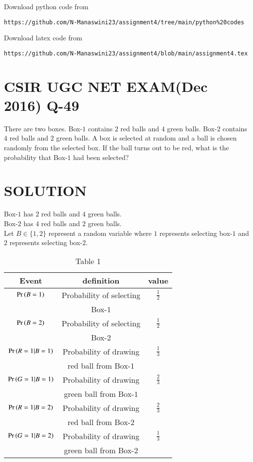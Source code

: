 \documentclass[journal,12pt,twocolumn]{IEEEtran}
\begin{document}
\renewcommand{\thefigure}{\theenumi}
\renewcommand{\thetable}{\theenumi}
Download python code from 
\begin{lstlisting}
https://github.com/N-Manaswini23/assignment4/tree/main/python%20codes
\end{lstlisting}
%
Download latex code from 
\begin{lstlisting}
https://github.com/N-Manaswini23/assignment4/blob/main/assignment4.tex
\end{lstlisting}
%

\section*{CSIR UGC NET EXAM(Dec 2016) Q-49}
There are two boxes. Box-$1$ contains $2$ red balls and $4$ green balls. Box-$2$ contains $4$ red balls and $2$ green balls. A box is selected at random and a ball is chosen randomly from the selected box. If the ball turns out to be red, what is the probability that Box-$1$ had been selected?
\section*{SOLUTION}
Box-$1$ has $2$ red balls and $4$ green balls.\\
Box-$2$ has $4$ red balls and $2$ green balls.\\
Let $B \in \{1,2\} $ represent a random variable where $1$ represents selecting box-$1$ and $2$ represents selecting box-$2$.

\begin{table}[h!]
\resizebox{9cm}{!}
{ 
\begin{tabular}{|c|c|c|}
\hline
Event & definition & value\\
\hline
$ \Pr\left(B=1\right) $ & Probability of selecting  & $\frac{1}{2}$\\
&Box-$1$ & \\
\hline
$ \Pr\left(B=2\right) $ & Probability of selecting & $\frac{1}{2}$ \\
& Box-$2$& \\
\hline
$\Pr\left(R=1|B=1\right)$ & Probability of drawing &  $\frac{1}{3}$   \\
&  red ball from Box-$1$ &\\
\hline
$\Pr\left(G=1|B=1\right)$ & Probability of drawing &  $\frac{2}{3}$   \\
&  green ball from Box-$1$ &\\
\hline
$\Pr\left(R=1|B=2\right)$ & Probability of drawing &  $\frac{2}{3}$   \\
&  red ball from Box-$2$ &\\
\hline
$\Pr\left(G=1|B=2\right)$ & Probability of drawing &  $\frac{1}{3}$   \\
&  green ball from Box-$2$ &\\
\hline
\end{tabular}
}
\caption{Table 1} 
\label{tab:1}
\end{table}
\end{document}
